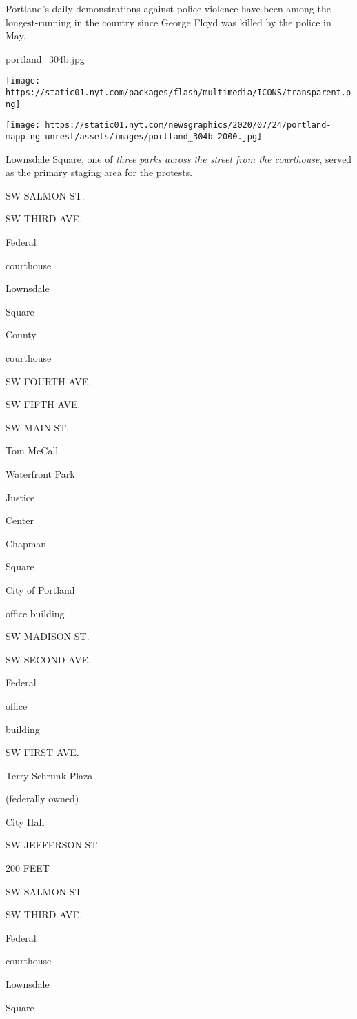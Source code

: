 Portland's daily demonstrations against police violence have been among
the longest-running in the country since George Floyd was killed by the
police in May.

portland\_304b.jpg

\texttt{[image: https://static01.nyt.com/packages/flash/multimedia/ICONS/transparent.png]}

\texttt{[image: https://static01.nyt.com/newsgraphics/2020/07/24/portland-mapping-unrest/assets/images/portland\_304b-2000.jpg]}

Lownsdale Square, one of \emph{three parks across the street from the
courthouse}, served as the primary staging area for the protests.

SW SALMON ST.

SW THIRD AVE.

Federal

courthouse

Lownsdale

Square

County

courthouse

SW FOURTH AVE.

SW FIFTH AVE.

SW MAIN ST.

Tom McCall

Waterfront Park

Justice

Center

Chapman

Square

City of Portland

office building

SW MADISON ST.

SW SECOND AVE.

Federal

office

building

SW FIRST AVE.

Terry Schrunk Plaza

(federally owned)

City Hall

SW JEFFERSON ST.

200 FEET

SW SALMON ST.

SW THIRD AVE.

Federal

courthouse

Lownsdale

Square

